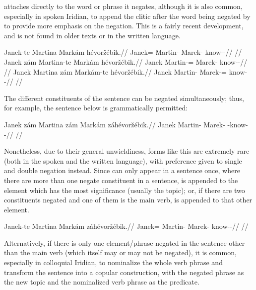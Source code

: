  attaches directly to the word or phrase it negates, although it is
also common, especially in spoken Iridian, to append the clitic  after
the word being negated by  to provide more emphasis on the negation.
This is a fairly recent development, and is not found in older texts or in the
written language.

\pex
\a
\begingl
     Janek{-te} Martina Markám hévoržébik.//
    \glb \Neg{} Janek=\Foc{} Martin-\Acc{} Marek-\Agt{} know-\Ben{}-\Pf{}//
    \glft {}//
\endgl
\a
\begingl
    \gla Janek {zám} Martina{-te} Markám hévoržébik.//
    \glb Janek \Neg{} Martin-\Acc{}=\Foc{} Marek-\Agt{} know-\Ben{}-\Pf{}//
    \glft {}//
\endgl
\a
\begingl
    \gla Janek Martina {zám} Markám{-te} hévoržébik.//
    \glb Janek Martin-\Acc{} \Neg{} Marek-\Agt{}=\Foc{} know-\Ben{}-\Pf{}//
    \glft {}//
\endgl
\xe

The different constituents of the sentence can be negated simultaneously; thus,
for example, the sentence below is grammatically permitted:

\pex
\begingl
     Janek {zám} Martina {zám} Markám {zá}hévoržébik.//
    \glb \Neg{} Janek \Neg{} Martin-\Acc{} \Neg{} Marek-\Agt{} \Neg{}-know-\Ben{}-\Pf{}//
    \glft {}//
\endgl
\xe

Nonetheless, due to their general unwieldiness, forms like this are extremely
rare (both in the spoken and the written language), with preference given to
single and double negation instead. Since  can only appear in a
sentence once, where there are more than one negate constituent in a sentence,
 is appended to the element which has the most significance (usually
the topic); or, if there are two constituents negated and one of them is the
main verb,  is appended to that other element.

\pex
\begingl
     Janek{-te} Martina Markám {zá}hévoržébik.//
    \glb \Neg{} Janek=\Foc{} Martin-\Acc{} Marek-\Agt{} \Neg{}know-\Ben{}-\Pf{}//
    \glft {}//
\endgl
\xe

Alternatively, if there is only one element/phrase negated in the sentence other
than the main verb (which itself may or may not be negated), it is common,
especially in colloquial Iridian, to
nominalize the whole verb phrase and transform the
sentence into a copular construction, with the
negated phrase as the new topic and the nominalized verb phrase as
the predicate.

